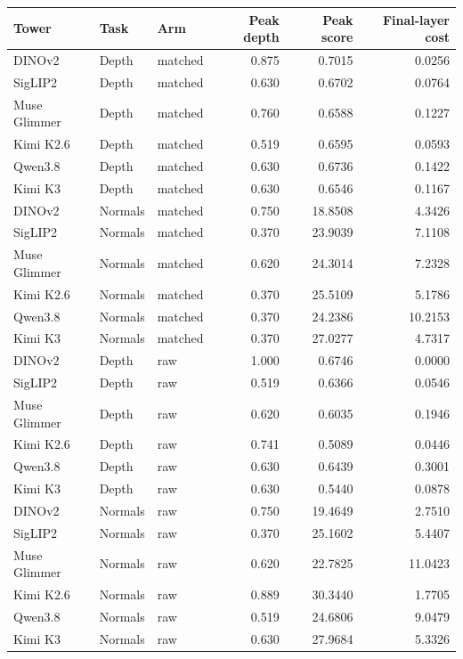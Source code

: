 \begin{tabular}{lllrrr}
\toprule
Tower & Task & Arm & Peak depth & Peak score & Final-layer cost\\
\midrule
DINOv2 & Depth & matched & 0.875 & 0.7015 & 0.0256\\
SigLIP2 & Depth & matched & 0.630 & 0.6702 & 0.0764\\
Muse Glimmer & Depth & matched & 0.760 & 0.6588 & 0.1227\\
Kimi K2.6 & Depth & matched & 0.519 & 0.6595 & 0.0593\\
Qwen3.8 & Depth & matched & 0.630 & 0.6736 & 0.1422\\
Kimi K3 & Depth & matched & 0.630 & 0.6546 & 0.1167\\
DINOv2 & Normals & matched & 0.750 & 18.8508 & 4.3426\\
SigLIP2 & Normals & matched & 0.370 & 23.9039 & 7.1108\\
Muse Glimmer & Normals & matched & 0.620 & 24.3014 & 7.2328\\
Kimi K2.6 & Normals & matched & 0.370 & 25.5109 & 5.1786\\
Qwen3.8 & Normals & matched & 0.370 & 24.2386 & 10.2153\\
Kimi K3 & Normals & matched & 0.370 & 27.0277 & 4.7317\\
DINOv2 & Depth & raw & 1.000 & 0.6746 & 0.0000\\
SigLIP2 & Depth & raw & 0.519 & 0.6366 & 0.0546\\
Muse Glimmer & Depth & raw & 0.620 & 0.6035 & 0.1946\\
Kimi K2.6 & Depth & raw & 0.741 & 0.5089 & 0.0446\\
Qwen3.8 & Depth & raw & 0.630 & 0.6439 & 0.3001\\
Kimi K3 & Depth & raw & 0.630 & 0.5440 & 0.0878\\
DINOv2 & Normals & raw & 0.750 & 19.4649 & 2.7510\\
SigLIP2 & Normals & raw & 0.370 & 25.1602 & 5.4407\\
Muse Glimmer & Normals & raw & 0.620 & 22.7825 & 11.0423\\
Kimi K2.6 & Normals & raw & 0.889 & 30.3440 & 1.7705\\
Qwen3.8 & Normals & raw & 0.519 & 24.6806 & 9.0479\\
Kimi K3 & Normals & raw & 0.630 & 27.9684 & 5.3326\\
\bottomrule
\end{tabular}
